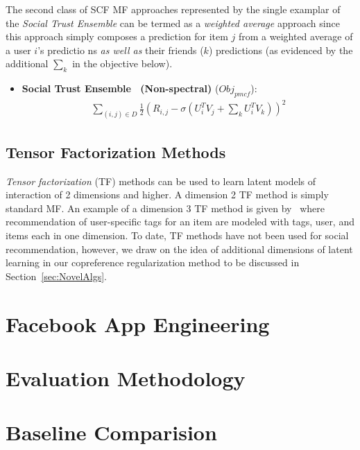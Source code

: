 \documentclass{sig-alternate}
\newcommand{\Obj}{\mathit{Obj}}
\newcommand{\pmcf}{\mathit{pmcf}}
\begin{document}
The second class of SCF MF approaches represented by the single
examplar of the {\it Social Trust Ensemble} can be termed as a
\emph{weighted average} approach since this approach simply composes a
prediction for item $j$ from a weighted average of a user $i$'s
predictio
ns \emph{as well as} their friends ($k$) predictions (as
evidenced by the additional $\sum_k$ in the objective below).

\begin{itemize}
\item {\bf Social Trust Ensemble~\cite{ste} (Non-spectral)} ($\Obj_\pmcf$):
\begin{align}
\sum_{(i,j) \in D} \frac{1}{2} (R_{i,j} - \sigma (U_i^T V_j + \sum_k U_i^T V_k))^2 \nonumber
\end{align}
\end{itemize}

\subsection{Tensor Factorization Methods}


\emph{Tensor factorization} (TF) methods can be used to learn latent
models of interaction of 2 dimensions and higher.  A dimension 2 TF
method is simply standard MF.  An example of a dimension 3 TF method
is given by~\cite{tf} where recommendation of user-specific tags for
an item are modeled with tags, user, and items each in one dimension.
To date, TF methods have not been used for social recommendation,
however, we draw on the idea of additional dimensions of latent learning
in our copreference regularization method to be discussed in
Section~\ref{sec:NovelAlgs}.

\section{Facebook App Engineering}

\label{sec:FacebookApp}

\section{Evaluation Methodology}

\label{sec:Evaluation}

\section{Baseline Comparision}
\end{document}
